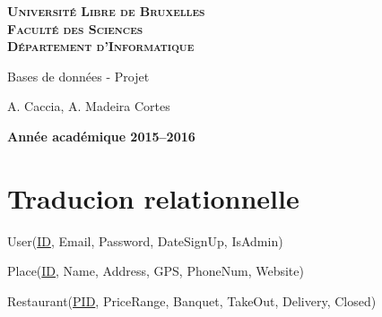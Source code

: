 \documentclass[a4paper,10pt]{article}
\begin{document}
\begin{titlepage}
    \begin{center}
        \textbf{\textsc{Université Libre de Bruxelles}}\\
        \textbf{\textsc{Faculté des Sciences}}\\
        \textbf{\textsc{Département d'Informatique}}

        \vfill{}
        \vfill{}

        \begin{center}
            {\Huge Bases de données - Projet}
        \end{center}

        {\Huge \par}

        \begin{center}
            {\large A. Caccia, A. Madeira Cortes}
        \end{center}

        {\Huge \par}
        \vfill{}
        \vfill{}

        {\large\par}
        \vfill{}
        \vfill{}

        \textbf{Année académique 2015--2016}
    \end{center}
\end{titlepage}

\tableofcontents

\newpage



\section{Traducion relationnelle}

User(\underline{ID}, Email, Password, DateSignUp, IsAdmin)

\hspace{-0,5cm}Place(\underline{ID}, Name, Address, GPS, PhoneNum, Website)

\hspace{-0,5cm}Restaurant(\underline{PID}, PriceRange, Banquet, TakeOut, Delivery, Closed)
\end{document}
